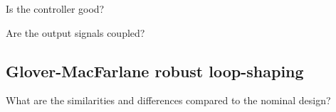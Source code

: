 \documentclass[a4paper,12pt,oneside,onecolumn]{article} %
\newcommand{\image}[3][width=1.0\columnwidth]{
	\begin{figure}[h!]
		\centering
	    \texttt{[image: \#2]}
		\caption{#3}
		\label{fig:#2}
	\end{figure}
}
\newcommand{\imaget}[3][width=1.0\columnwidth]{
	\begin{figure}[H]
		\centering
      
		\caption{#3}
		\label{fig:#2}
	\end{figure}
}
\begin{document}

	Is the controller good?
	\par\dotfill\par\dotfill\par
	Are the output signals coupled?
	\par\dotfill\par\dotfill

	\subsection*{Glover-MacFarlane robust loop-shaping}


	What are the similarities and differences compared to the nominal design?
	\par\dotfill\par\dotfill
\end{document}
